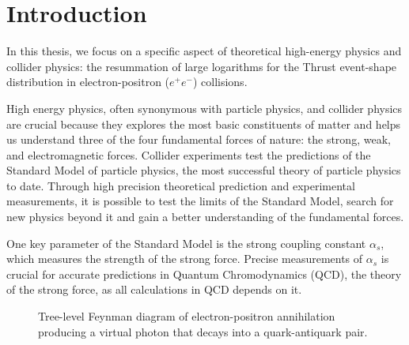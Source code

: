 \documentclass[../main.tex]{subfiles}
\begin{document}
\chapter{Introduction}\label{ch:introduction}

In this thesis, we focus on a specific aspect of theoretical high-energy physics and collider physics: the resummation of large logarithms for 
the Thrust event-shape distribution in electron-positron ($e^+e^-$) collisions.

High energy physics, often synonymous with particle physics, and collider physics are crucial because 
they explores the most basic constituents of matter and helps us understand three of the four fundamental forces of nature: 
the strong, weak, and electromagnetic forces. Collider experiments test the predictions of the Standard Model of particle physics,
the most successful theory of particle physics to date. Through high precision theoretical prediction and experimental measurements,
it is possible to test the limits of the Standard Model, search for new physics beyond it and gain a better understanding of the fundamental forces. 

One key parameter of the Standard Model is the strong coupling constant $\alpha_s$, which measures the strength of the strong force.
Precise measurements of $\alpha_s$ is crucial for accurate predictions in Quantum Chromodynamics (QCD), the theory of the strong force, as all calculations in QCD
depends on it.

\begin{figure}[h!]
    \centering
    \caption{Tree-level Feynman diagram of electron-positron annihilation producing a virtual photon that decays into a quark-antiquark pair.}
    \label{fig:ep_annihilation}
\end{figure}
\end{document}
